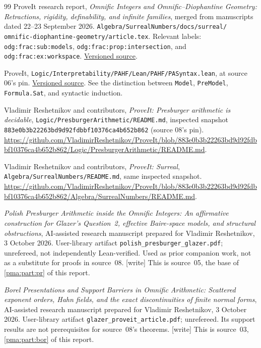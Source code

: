 \documentclass[11pt]{article}
\numberwithin{equation}{section}
\theoremstyle{definition}
\theoremstyle{remark}
\newcommand{\writetag}{\textup{\textsf{\small[write]}}}
\begin{document}
\begin{thebibliography}{99}
ProveIt research report,
\emph{Omnific Integers and Omnific--Diophantine Geometry:
Retractions, rigidity, definability, and infinite families},
merged from manuscripts dated 22--23 September 2026.
\texttt{Algebra/SurrealNumbers/docs/surreal/}\allowbreak
\texttt{omnific-diophantine-geometry/article.tex}.
Relevant labels:
\texttt{odg:frac:sub:models},
\texttt{odg:frac:prop:intersection}, and
\texttt{odg:frac:ex:workspace}.
\href{https://github.com/VladimirReshetnikov/ProveIt/blob/fa2f3e419e592a1e90c065b79d559865ec45d436/Algebra/SurrealNumbers/docs/surreal/omnific-diophantine-geometry/article.tex}{Versioned source}.

ProveIt,
\texttt{Logic/Interpretability/PAHF/Lean/PAHF/PASyntax.lean},
at source 06's pin.
\href{https://github.com/VladimirReshetnikov/ProveIt/blob/fa2f3e419e592a1e90c065b79d559865ec45d436/Logic/Interpretability/PAHF/Lean/PAHF/PASyntax.lean}{Versioned source}.
See the distinction between \texttt{Model}, \texttt{PreModel},
\texttt{Formula.Sat}, and syntactic induction.

Vladimir Reshetnikov and contributors,
\emph{ProveIt: Presburger arithmetic is decidable},
\texttt{Logic/PresburgerArithmetic/README.md}, inspected snapshot
\texttt{883e0b3b22263bd9d92fdbbf10376ca4b652b862} (source 08's pin).
\url{https://github.com/VladimirReshetnikov/ProveIt/blob/883e0b3b22263bd9d92fdbbf10376ca4b652b862/Logic/PresburgerArithmetic/README.md}.

Vladimir Reshetnikov and contributors,
\emph{ProveIt: Surreal},
\texttt{Algebra/SurrealNumbers/README.md}, same inspected snapshot.
\url{https://github.com/VladimirReshetnikov/ProveIt/blob/883e0b3b22263bd9d92fdbbf10376ca4b652b862/Algebra/SurrealNumbers/README.md}.

\emph{Polish Presburger Arithmetic inside the Omnific Integers:
An affirmative construction for Glazer's Question~2, effective Baire-space
models, and structural obstructions},
AI-assisted research manuscript prepared for Vladimir Reshetnikov,
3 October 2026. User-library artifact
\texttt{polish\_presburger\_glazer.pdf}; unrefereed, not independently
Lean-verified. Used as prior companion work, not as a substitute for
proofs in source~08. \writetag{} This is source~05, the base of
\cref{pma:part:pr} of this report.

\emph{Borel Presentations and Support Barriers in Omnific Arithmetic:
Scattered exponent orders, Hahn fields, and the exact discontinuities of
finite normal forms},
AI-assisted research manuscript prepared for Vladimir Reshetnikov,
3 October 2026. User-library artifact
\texttt{glazer\_proveit\_article.pdf}; unrefereed. Its support results
are not prerequisites for source~08's theorems. \writetag{} This is
source~03, \cref{pma:part:bor} of this report.


\end{thebibliography}
\end{document}

